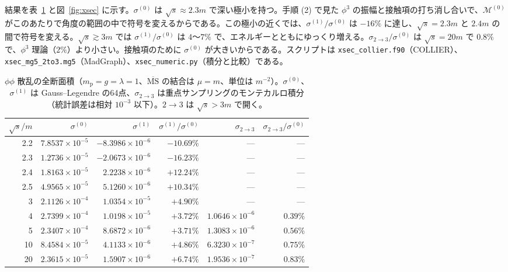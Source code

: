 \documentclass[a4paper,10pt]{ltjsarticle}
\begin{document}
結果を表~\ref{tab:xsec} と図~\ref{fig:xsec} に示す。$\sigma^{(0)}$ は $\sqrt s\approx2.3m$ で深い極小を持つ。手順 (2) で見た $\phi^3$ の振幅と接触項の打ち消し合いで、$\mathcal{M}^{(0)}$ がこのあたりで角度の範囲の中で符号を変えるからである。この極小の近くでは、$\sigma^{(1)}/\sigma^{(0)}$ は $-16\%$ に達し、$\sqrt s=2.3m$ と $2.4m$ の間で符号を変える。$\sqrt s\gtrsim3m$ では $\sigma^{(1)}/\sigma^{(0)}$ は $4$〜$7\%$ で、エネルギーとともにゆっくり増える。$\sigma_{2\to3}/\sigma^{(0)}$ は $\sqrt s=20m$ で $0.8\%$ で、$\phi^3$ 理論（$2\%$）より小さい。接触項のために $\sigma^{(0)}$ が大きいからである。スクリプトは \texttt{xsec\_collier.f90}（COLLIER）、\texttt{xsec\_mg5\_2to3.mg5}（MadGraph）、\texttt{xsec\_numeric.py}（積分と比較）である。

\begin{table}[tbp]
\centering\small
\caption{$\phi\phi$ 散乱の全断面積（$m_{\mathrm p}=g=\lambda=1$、$\overline{\mathrm{MS}}$ の結合は $\mu=m$、単位は $m^{-2}$）。$\sigma^{(0)}$、$\sigma^{(1)}$ は Gauss--Legendre の64点、$\sigma_{2\to3}$ は重点サンプリングのモンテカルロ積分（統計誤差は相対 $10^{-3}$ 以下）。$2\to3$ は $\sqrt s>3m$ で開く。}
\label{tab:xsec}
\begin{tabular}{rrrrrr}
\toprule
$\sqrt s/m$ & $\sigma^{(0)}$ & $\sigma^{(1)}$ & $\sigma^{(1)}/\sigma^{(0)}$ & $\sigma_{2\to3}$ & $\sigma_{2\to3}/\sigma^{(0)}$ \\
\midrule
2.2 & $7.8537\times10^{-5}$ & $-8.3986\times10^{-6}$ & $-10.69\%$ & — & — \\
2.3 & $1.2736\times10^{-5}$ & $-2.0673\times10^{-6}$ & $-16.23\%$ & — & — \\
2.4 & $1.8163\times10^{-5}$ & $2.2238\times10^{-6}$ & $+12.24\%$ & — & — \\
2.5 & $4.9565\times10^{-5}$ & $5.1260\times10^{-6}$ & $+10.34\%$ & — & — \\
3 & $2.1126\times10^{-4}$ & $1.0354\times10^{-5}$ & $+4.90\%$ & — & — \\
4 & $2.7399\times10^{-4}$ & $1.0198\times10^{-5}$ & $+3.72\%$ & $1.0646\times10^{-6}$ & $0.39\%$ \\
5 & $2.3407\times10^{-4}$ & $8.6872\times10^{-6}$ & $+3.71\%$ & $1.3083\times10^{-6}$ & $0.56\%$ \\
10 & $8.4584\times10^{-5}$ & $4.1133\times10^{-6}$ & $+4.86\%$ & $6.3230\times10^{-7}$ & $0.75\%$ \\
20 & $2.3615\times10^{-5}$ & $1.5907\times10^{-6}$ & $+6.74\%$ & $1.9536\times10^{-7}$ & $0.83\%$ \\
\bottomrule
\end{tabular}
\end{table}
\end{document}
